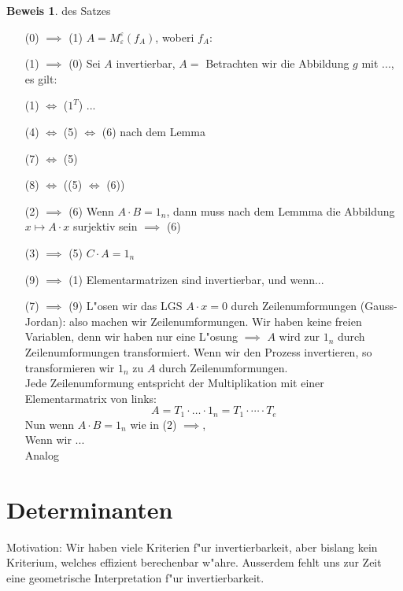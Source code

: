 \documentclass[oneside,fontsize=11pt,paper=a4,BCOR=0mm,DIV=12,automark,headsepline]{scrbook}
\theoremstyle{remark}
\theoremstyle{definition}
\theoremstyle{definition}
\newtheorem*{prof}{Beweis}
\theoremstyle{remark}
\begin{document}
\begin{prof}{des Satzes}\leavevmode
  \begin{itemize}
  \item[(0) $\implies$ (1)]  $A=M^{\varepsilon}_{\varepsilon}(f_A)$, woberi $f_A:$
  \item[(1) $\implies$ (0)] Sei $A$ invertierbar, $A=$ Betrachten wir die
    Abbildung $g$ mit ..., es gilt: 
  \item[(1) $\iff$ ($1^T$)] ...
  \item[(4) $ \iff $ (5) $ \iff $ (6)] nach dem Lemma
  \item[(7) $ \iff $ (5)]
  \item[(8) $ \iff $ ((5) $ \iff $ (6))]
  \item[(2) $ \implies $ (6)] Wenn $A\cdot B=1_n$, dann muss nach dem Lemmma die
    Abbildung $x\mapsto A\cdot x$ surjektiv sein $\implies$ (6)
  \item[(3) $ \implies $ (5)] $C\cdot A = 1_n$
  \item[(9) $ \implies $ (1)] Elementarmatrizen sind invertierbar, und wenn...
  \item[(7) $ \implies $ (9)] L"osen wir das LGS $A\cdot x = 0$ durch
    Zeilenumformungen (Gauss-Jordan): also machen wir Zeilenumformungen. Wir
    haben keine freien Variablen, denn wir haben nur eine L"osung $\implies$
    $A$ wird zur $1_n$ durch Zeilenumformungen transformiert. Wenn wir den
    Prozess invertieren, so transformieren wir $1_n$ zu $A$ durch
    Zeilenumformungen. \\
    Jede Zeilenumformung entspricht der Multiplikation mit einer
    Elementarmatrix von links: \[A=T_1 \cdot \dots \cdot 1_n = T_1 \cdot \cdots
      \cdot T_e\]
    Nun wenn $A\cdot B = 1_n$ wie in (2) $\implies$, \\
    Wenn wir ... \\
    Analog
  \end{itemize}
\end{prof}

\chapter{Determinanten}
\label{sec:det}

Motivation: Wir haben viele Kriterien f"ur invertierbarkeit, aber bislang kein
Kriterium, welches effizient berechenbar w"ahre. Ausserdem fehlt uns zur Zeit
eine geometrische Interpretation f"ur invertierbarkeit.
\end{document}
